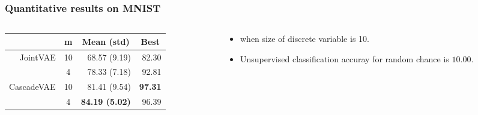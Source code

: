 \documentclass[10pt,mathserif]{beamer}
\begin{document}
\begin{frame}
\frametitle{Quantitative results on MNIST}
\begin{columns}
\begin{column}{0.5\textwidth}
\begin{table}[htbp]
\centering
\fontsize{9pt}{9.5pt}\selectfont
\begin{tabular}{rc rr}
\addlinespace[-\aboverulesep]
\toprule
\multicolumn{1}{c}{Method}&m& \multicolumn{1}{c}{Mean (std)}&\multicolumn{1}{c}{Best}\\
\toprule
JointVAE & 10&68.57 (9.19) &82.30\\
        &  4&78.33 (7.18) &92.81\\
\midrule
CascadeVAE &10&81.41 (9.54)& \textbf{97.31}\\
           & 4&\textbf{84.19 (5.02)}& 96.39\\
\bottomrule
\end{tabular}
\end{table}
\end{column}
\begin{column}{0.4\textwidth}
\begin{itemize}\itemsep=12pt
\item {\color{blue}{Unsupervised classification accuracy}} when size of discrete variable is 10.
\item Unsupervised classification accuray for random chance is $10.00$.
\end{itemize}

\end{column}
\end{columns}
\end{frame}
\end{document}
